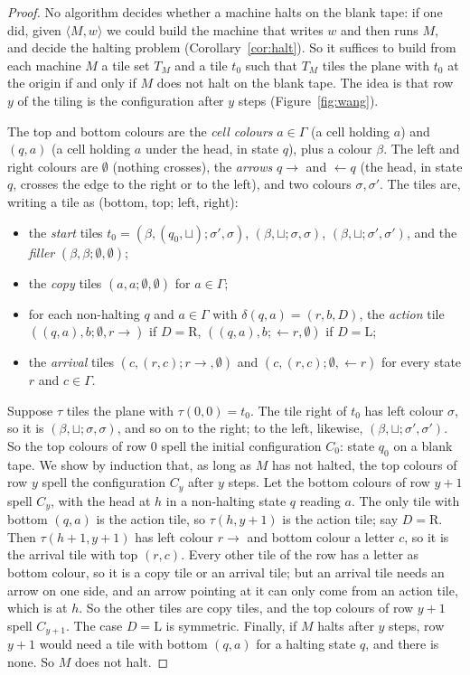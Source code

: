 \begin{proof}
No algorithm decides whether a machine halts on the blank tape: if one did, given $\langle M,w\rangle$ we could build the machine that writes $w$ and then runs $M$, and decide the halting problem (Corollary~\ref{cor:halt}). So it suffices to build from each machine $M$ a tile set $T_M$ and a tile $t_0$ such that $T_M$ tiles the plane with $t_0$ at the origin if and only if $M$ does not halt on the blank tape. The idea is that row $y$ of the tiling is the configuration after $y$ steps (Figure~\ref{fig:wang}).

The top and bottom colours are the \emph{cell colours} $a\in\Gamma$ (a cell holding $a$) and $(q,a)$ (a cell holding $a$ under the head, in state $q$), plus a colour $\beta$. The left and right colours are $\emptyset$ (nothing crosses), the \emph{arrows} $q{\to}$ and ${\leftarrow}q$ (the head, in state $q$, crosses the edge to the right or to the left), and two colours $\sigma,\sigma'$. The tiles are, writing a tile as (bottom, top; left, right):
\begin{itemize}
\item the \emph{start} tiles $t_0=(\beta,(q_0,\sqcup);\sigma',\sigma)$, $(\beta,\sqcup;\sigma,\sigma)$, $(\beta,\sqcup;\sigma',\sigma')$, and the \emph{filler} $(\beta,\beta;\emptyset,\emptyset)$;
\item the \emph{copy} tiles $(a,a;\emptyset,\emptyset)$ for $a\in\Gamma$;
\item for each non-halting $q$ and $a\in\Gamma$ with $\delta(q,a)=(r,b,D)$, the \emph{action} tile $((q,a),b;\emptyset,r{\to})$ if $D=\mathrm R$, $((q,a),b;{\leftarrow}r,\emptyset)$ if $D=\mathrm L$;
\item the \emph{arrival} tiles $(c,(r,c);r{\to},\emptyset)$ and $(c,(r,c);\emptyset,{\leftarrow}r)$ for every state $r$ and $c\in\Gamma$.
\end{itemize}

Suppose $\tau$ tiles the plane with $\tau(0,0)=t_0$. The tile right of $t_0$ has left colour $\sigma$, so it is $(\beta,\sqcup;\sigma,\sigma)$, and so on to the right; to the left, likewise, $(\beta,\sqcup;\sigma',\sigma')$. So the top colours of row $0$ spell the initial configuration $C_0$: state $q_0$ on a blank tape. We show by induction that, as long as $M$ has not halted, the top colours of row $y$ spell the configuration $C_y$ after $y$ steps. Let the bottom colours of row $y+1$ spell $C_y$, with the head at $h$ in a non-halting state $q$ reading $a$. The only tile with bottom $(q,a)$ is the action tile, so $\tau(h,y+1)$ is the action tile; say $D=\mathrm R$. Then $\tau(h+1,y+1)$ has left colour $r{\to}$ and bottom colour a letter $c$, so it is the arrival tile with top $(r,c)$. Every other tile of the row has a letter as bottom colour, so it is a copy tile or an arrival tile; but an arrival tile needs an arrow on one side, and an arrow pointing at it can only come from an action tile, which is at $h$. So the other tiles are copy tiles, and the top colours of row $y+1$ spell $C_{y+1}$. The case $D=\mathrm L$ is symmetric. Finally, if $M$ halts after $y$ steps, row $y+1$ would need a tile with bottom $(q,a)$ for a halting state $q$, and there is none. So $M$ does not halt.


\end{proof}
